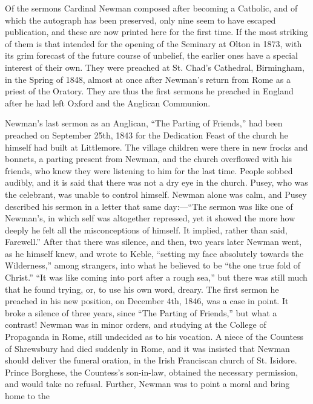 



Of the sermons Cardinal Newman composed after
becoming a Catholic, and of which the autograph has been preserved,
only nine seem to have escaped publication, and these are now printed
here for the first time. If the most striking of them is that intended
for the opening of the Seminary at Olton in 1873, with its grim
forecast of the future course of unbelief, the earlier ones have a
special interest of their own. They were preached at St. Chad's
Cathedral, Birmingham, in the Spring of 1848, almost at once after
Newman's return from Rome as a priest of the Oratory. They are thus
the first sermons he preached in England after he had left Oxford and
the Anglican Communion.


Newman's last sermon as an Anglican, ``The
Parting of Friends,''  had
been preached on September 25th, 1843 for the Dedication Feast of the
church he himself had built at Littlemore. The village children were
there in new frocks and bonnets, a parting present from Newman, and the church overflowed with his friends, who knew they were
listening to him for the last time. People sobbed audibly, and it is
said that there was not a dry eye in the church. Pusey, who was the
celebrant, was unable to control himself. Newman alone was calm, and
Pusey described his sermon in a letter that same day:—``The
sermon was like one of Newman's, in which self was altogether
repressed, yet it showed the more how deeply he felt all the
misconceptions of himself. It implied, rather than said, Farewell.''  After that there was silence, and then, two years later Newman
went, as he himself knew, and wrote to Keble, ``setting my face
absolutely towards the Wilderness,'' among strangers, into what he
believed to be ``the one true fold of Christ.'' ``It was like coming into
port after a rough sea,'' but there was still much that he found
trying, or, to use his own word, dreary. The first sermon he preached
in his new position, on December 4th, 1846, was a case in point. It
broke a silence of three years, since ``The Parting of Friends,'' but
what a contrast! Newman was in minor orders, and studying at the
College of Propaganda in Rome, still undecided as to his vocation. A
niece of the Countess of Shrewsbury had died suddenly in Rome, and it
was insisted that Newman should deliver the funeral oration, in the
Irish Franciscan church of St. Isidore. Prince Borghese, the Countess's
son-in-law, obtained the necessary permission, and would take no
refusal. Further, Newman was to point a moral and bring home to the
